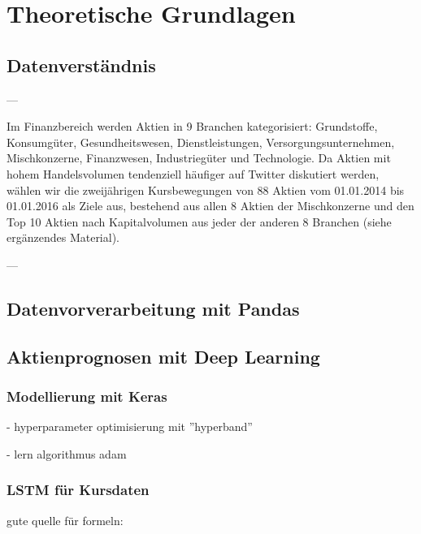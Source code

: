 \newpage
\section{Theoretische Grundlagen}\label{sec:theorie}



\subsection{Datenverständnis}\label{sec:theorie_data_understanding}

---

Im Finanzbereich werden Aktien in 9 Branchen kategorisiert: Grundstoffe, Konsumgüter, Gesundheitswesen, Dienstleistungen, Versorgungsunternehmen, Mischkonzerne, Finanzwesen, Industriegüter und Technologie. Da Aktien mit hohem Handelsvolumen tendenziell häufiger auf Twitter diskutiert werden, wählen wir die zweijährigen Kursbewegungen von 88 Aktien vom 01.01.2014 bis 01.01.2016 als Ziele aus, bestehend aus allen 8 Aktien der Mischkonzerne und den Top 10 Aktien nach Kapitalvolumen aus jeder der anderen 8 Branchen (siehe ergänzendes Material).

---
\autocite[Kap. 3]{xu2018StockMovement}

\subsection{Datenvorverarbeitung mit Pandas}\label{sec:theorie_pandas}

\subsection{Aktienprognosen mit Deep Learning}\label{sec:theorie_dl}

\subsubsection{Modellierung mit Keras}\label{sec:theorie_keras}
- hyperparameter optimisierung mit ''hyperband''
\autocite{li2018hyperband}

- lern algorithmus adam 
\autocite{website:keras-adam}
\autocite{kingma2015adam}

\subsubsection{LSTM für Kursdaten}\label{sec:theorie_lstm}

gute quelle für formeln: \autocite{guan2020stockprice}

